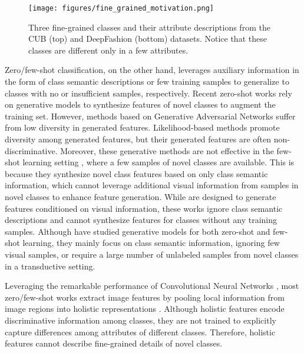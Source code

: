 \documentclass[10pt,journal,compsoc]{IEEEtran}
\newcommand{\1}{\boldsymbol{1}}
\newcommand{\0}{\boldsymbol{0}}
\newcommand{\<}{\langle}
\renewcommand{\>}{\rangle}
\begin{document}
\begin{figure}[t]
\centering
\texttt{[image: figures/fine\_grained\_motivation.png]}
\caption{
\small{
Three fine-grained classes and their attribute descriptions from the CUB (top) and DeepFashion (bottom) datasets. Notice that these classes are different only in a few attributes.
}
}
\label{fig:att_samples}
\vspace{-2mm}
\end{figure}


Zero/few-shot classification, on the other hand, leverages auxiliary information in the form of class semantic descriptions or few training samples to generalize to classes with no or insufficient samples, respectively. Recent zero-shot works rely on generative models \cite{Felix:ECCV18,Xian:CVPR19,Schonfeld:CVPR19,Zhu:ICCV19,Huang:CVPR19,Sariyildiz:CVPR19} to synthesize features of novel classes to augment the training set.
However, methods based on Generative Adversarial Networks \cite{Huang:CVPR19,Felix:ECCV18,Xian:CVPR19} suffer from low diversity in generated features.
Likelihood-based methods \cite{Arora:CVPR18,Xian:CVPR19,Schonfeld:CVPR19,Zhu:ICCV19,Yu:neurIPS19} promote diversity among generated features, but their generated features are often non-discriminative.
Moreover, these generative methods are not effective in the few-shot learning setting \cite{Vinyals:NIPS16,Snell:NISP17,Finn:ICML17}, where a few samples of novel classes are available. This is because they synthesize novel class features based on only class semantic information, which cannot leverage additional visual information from samples in novel classes to enhance feature generation. While \cite{Hariharan:ICCV17,Wang:18,Li:CVPR20,Chen:CVPR19,Schwartz:NeurIPS18,Zhang:NeurIPS18} are designed to generate features conditioned on visual information, these works ignore class semantic descriptions and cannot synthesize features for classes without any training samples. Although \cite{Xian:CVPR19,Schonfeld:CVPR19} have studied generative models for both zero-shot and few-shot learning, they mainly focus on class semantic information, ignoring few visual samples, or require a large number of unlabeled samples from novel classes in a transductive setting. 

Leveraging the remarkable performance of Convolutional Neural Networks \cite{Simonyan:CORR15,He:CVPR16}, most zero/few-shot works extract image features by pooling local information from image regions into holistic representations \cite{Felix:ECCV18,Xian:CVPR17,Schonfeld:CVPR19,Zhu:ICCV19,Changpinyo:CVPR16,Zhang:CVPR16}.
Although holistic features encode discriminative information among classes, they are not trained to explicitly capture differences among attributes of different classes. Therefore, holistic features cannot describe fine-grained details of novel classes.
\end{document}
